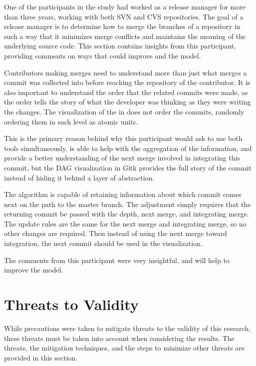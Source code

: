 One of the participants in the study had worked as a release manager for
more than three years, working with both SVN and CVS repositories. The
goal of a release manager is to determine how to merge the branches of a
repository in such a way that it minimizes merge conflicts and maintains
the meaning of the underlying source code. This section contains
insights from this participant, providing comments on ways that could
improve \tool{} and the \mt{} model.

Contributors making merges need to understand more than just what merges
a commit was collected into before reaching the repository of the
contributor.
It is also important to understand the order that the
related commits were made, as the order tells the story of what the
developer was thinking as they were writing the changes.
The visualization of the \mt{} in \tool{} does not order the commits,
randomly ordering them in each level as atomic units.

This is the primary reason behind why this participant would ask to use
both tools simultaneously. \tool{} is able to help with the aggregation
of the information, and provide a better understanding of the next merge
involved in integrating this commit, but the DAG visualization in Gitk
provides the full story of the commit instead of hiding it behind a
layer of abstraction.

The algorithm is capable of retaining information about which commit
comes next on the path to the master branch.
The adjustment simply requires that the returning commit be passed
with the depth, next merge, and integrating merge.
The update rules are the same for the next merge and integrating merge,
so no other changes are required.
Then instead of using the next merge toward integration, the next commit
should be used in the visualization.

The comments from this participant were very insightful, and will help
to improve the \mt{} model.

\section{Threats to Validity}\label{sec:threats_to_validity}

While precautions were taken to mitigate threats to the validity of this
research, these threats must be taken into account when considering the results.
The threats, the mitigation techniques, and the steps to minimize
other threats are provided in this section.

